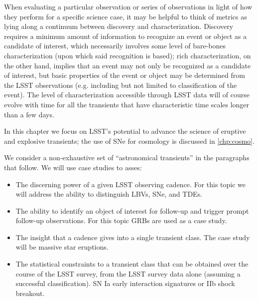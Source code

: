 When evaluating a particular observation or series of observations in light of how they perform for a specific science case, it may be helpful to think of metrics as lying along a continuum between discovery and characterization. Discovery requires a minimum amount of information to recognize an event or object as a candidate of interest, which necessarily involves some level of bare-bones characterization (upon which said recognition is based); rich characterization, on the other hand, implies that an event may not only be recognized as a candidate of interest, but basic properties of the event or object may be determined from the LSST observations (e.g. including but not limited to classification of the event). The level of characterization accessible through LSST data will of course evolve with time for all the transients that have characteristic time scales longer than a few days. 

In this chapter we focus on LSST's potential to advance the science of eruptive and explosive transients; the use of SNe for cosmology is discussed in \autoref{chp:cosmo}.

We consider a non-exhaustive set of ``astronomical transients'' in the paragraphs that follow. We will use case studies to asses: 

\begin{itemize}
\item
The discerning power of a given LSST observing cadence. For this topic we will address the ability to distinguish LBVs, SNe, and TDEs.
\item
The ability to identify an object of interest for follow-up and trigger prompt follow-up observations. For this topic GRBs are used as a case study.
\item
The insight that a cadence gives into a single transient class. The case study will be massive star eruptions.
\item 
The statistical constraints to a transient class that can be obtained over the course of the LSST survey, from the LSST survey data alone (assuming a successful classification). SN Ia early interaction signatures or IIb shock breakout.
\end{itemize}


